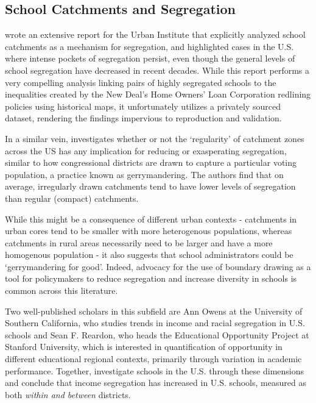 \subsection{School Catchments and Segregation}

\cite{monarrez2021RaciallyUnequal} wrote an extensive report for the
Urban Institute that explicitly analyzed school catchments as a
mechanism for segregation, and highlighted cases in the U.S. where
intense pockets of segregation persist, even though the general levels
of school segregation have decreased in recent decades. While this
report performs a very compelling analysis linking pairs of highly
segregated schools to the inequalities created by the New Deal's Home
Owners' Loan Corporation redlining policies using historical maps, it
unfortunately utilizes a privately sourced dataset, rendering the
findings impervious to reproduction and validation.

In a similar vein,\cite{saporito2016IrregularlyShaped} investigates
whether or not the `regularity' of catchment zones across the US has
any implication for reducing or exasperating segregation, similar to
how congressional districts are drawn to capture a particular voting
population, a practice known as gerrymandering. The authors find that
on average, irregularly drawn catchments tend to have lower levels of
segregation than regular (compact) catchments.

While this might be a consequence of different urban contexts -
catchments in urban cores tend to be smaller with more heterogenous
populations, whereas catchments in rural areas necessarily need to be
larger and have a more homogenous population - it also suggests that
school administrators could be `gerrymandering for good'. Indeed,
advocacy for the use of boundary drawing as a tool for policymakers
to reduce segregation and increase diversity in schools is common
across this literature.

Two well-published scholars in this subfield are Ann Owens at the
University of Southern California, who studies trends in income and
racial segregation in U.S. schools and Sean F. Reardon, who heads the
Educational Opportunity Project at Stanford University, which is
interested in quantification of opportunity in different educational
regional contexts, primarily through variation in academic
performance. Together, \cite{owens2016IncomeSegregation} investigate
schools in the U.S. through these dimensions and conclude that income
segregation has increased in U.S. schools, measured as both
\emph{within and between} districts.


